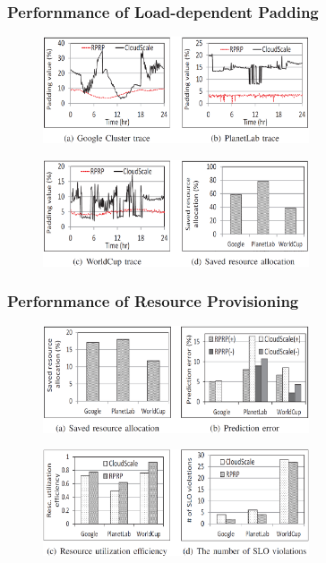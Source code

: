 \documentclass{beamer}
\begin{document}
	\begin{frame}
	\frametitle{Perfornmance of Load-dependent Padding}
		\begin{figure}[h!]
		\centering
		\includegraphics[width=0.7\textwidth]{./figure/eva1_2.PNG}
		\end{figure}
		\begin{figure}[h!]
		\centering
		\includegraphics[width=0.7\textwidth]{./figure/eva1_3.PNG}
		\end{figure}
	\end{frame}

	\begin{frame}
	\frametitle{Perfornmance of Resource Provisioning}
		\begin{figure}[h!]
		\centering
		\includegraphics[width=0.7\textwidth]{./figure/eva1_4.PNG}
		\end{figure}
		\begin{figure}[h!]
		\centering
		\includegraphics[width=0.7\textwidth]{./figure/eva1_5.PNG}
		\end{figure}
	\end{frame}
\end{document}
